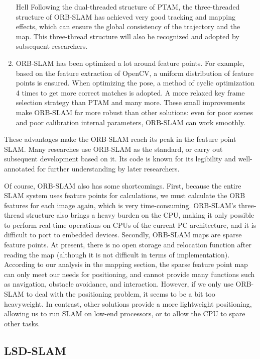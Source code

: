 \begin{enumerate}
Hell
\hspace{2em} Following the dual-threaded structure of PTAM, the three-threaded structure of ORB-SLAM has achieved very good tracking and mapping effects, which can ensure the global consistency of the trajectory and the map. This three-thread structure will also be recognized and adopted by subsequent researchers.
\item ORB-SLAM has been optimized a lot around feature points. For example, based on the feature extraction of OpenCV, a uniform distribution of feature points is ensured. When optimizing the pose, a method of cyclic optimization 4 times to get more correct matches is adopted. A more relaxed key frame selection strategy than PTAM and many more. These small improvements make ORB-SLAM far more robust than other solutions: even for poor scenes and poor calibration internal parameters, ORB-SLAM can work smoothly.
\end{enumerate}

These advantages make the ORB-SLAM reach its peak in the feature point SLAM. Many researches use ORB-SLAM as the standard, or carry out subsequent development based on it. Its code is known for its legibility and well-annotated for further understanding by later researchers.

Of course, ORB-SLAM also has some shortcomings. First, because the entire SLAM system uses feature points for calculations, we must calculate the ORB features for each image again, which is very time-consuming. ORB-SLAM's three-thread structure also brings a heavy burden on the CPU, making it only possible to perform real-time operations on CPUs of the current PC architecture, and it is difficult to port to embedded devices. Secondly, ORB-SLAM maps are sparse feature points. At present, there is no open storage and relocation function after reading the map (although it is not difficult in terms of implementation). According to our analysis in the mapping section, the sparse feature point map can only meet our needs for positioning, and cannot provide many functions such as navigation, obstacle avoidance, and interaction. However, if we only use ORB-SLAM to deal with the positioning problem, it seems to be a bit too heavyweight. In contrast, other solutions provide a more lightweight positioning, allowing us to run SLAM on low-end processors, or to allow the CPU to spare other tasks.

\subsection{LSD-SLAM}

